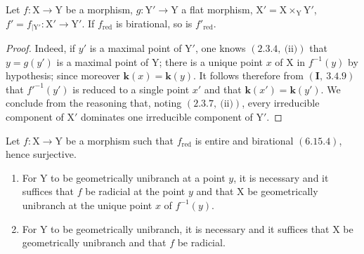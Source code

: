 \begin{lemma}[6.15.4.1]
\label{IV.6.15.4.1}
Let $f:\mathrm{X}\to\mathrm{Y}$ be a morphism, $g:\mathrm{Y}'\to\mathrm{Y}$ a flat morphism,
$\mathrm{X}'=\mathrm{X}\times_\mathrm{Y}\mathrm{Y}'$, $f'=f_{|\mathrm{Y}'}:\mathrm{X}'\to\mathrm{Y}'$. If $f_{\mathrm{red}}$ is birational, so is $f'_{\mathrm{red}}$.
\end{lemma}

\begin{proof}
Indeed, if $y'$ is a maximal point of $\mathrm{Y}'$, one knows $(2.3.4,~\text{(ii)})$ that $y=g(y')$ is
a maximal point of $\mathrm{Y}$; there is a unique point $x$ of $\mathrm{X}$ in $f^{-1}(y)$ by hypothesis; since moreover
$\boldsymbol{k}(x)=\boldsymbol{k}(y)$. It follows therefore from $(\mathbf{I},~3.4.9)$ that
$f'^{-1}(y')$ is reduced to a single point $x'$ and that $\boldsymbol{k}(x')=\boldsymbol{k}(y')$. We conclude from the reasoning
that, noting $(2.3.7,~\text{(ii)})$, every irreducible component of $\mathrm{X}'$ dominates
one irreducible component of $\mathrm{Y}'$.
\end{proof}

\begin{proposition}[6.15.5]
\label{IV.6.15.5}
Let $f:\mathrm{X}\to\mathrm{Y}$ be a morphism such that $f_{\mathrm{red}}$ is entire and birational
$(6.15.4)$, hence surjective.
\begin{enumerate}[label=(\roman*)]
  \item For $\mathrm{Y}$ to be geometrically unibranch at a point $y$, it is necessary and it suffices that $f$ be
radicial at the point $y$ and that $\mathrm{X}$ be geometrically unibranch at the unique point $x$ of $f^{-1}(y)$.
  \item For $\mathrm{Y}$ to be geometrically unibranch, it is necessary and it suffices that $\mathrm{X}$ be geometrically
unibranch and that $f$ be radicial.
\end{enumerate}
\end{proposition}

